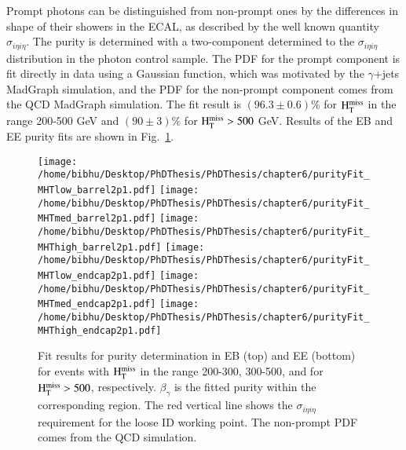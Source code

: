 Prompt photons can be distinguished from non-prompt ones by the differences in shape of their 
showers in the ECAL, as described by the well known quantity $\sigma_{i\eta i\eta}$. 
The purity is determined with a two-component determined to the $\sigma_{i\eta i\eta}$ distribution 
in the photon control sample.  The PDF for the prompt component is fit directly in data
using a Gaussian function, which was motivated by the $\gamma$+jets 
{\sc MadGraph} simulation, and the PDF for the non-prompt component comes from the QCD 
{\sc MadGraph} simulation.    The fit result is $(96.3 \pm 0.6)\%$ for $\rm H_{T}^{miss}$ in the range 200-500 GeV 
and $(90 \pm 3)\%$ for $\rm H_{T}^{miss} > 500$ GeV. Results of the EB and EE purity fits are shown in Fig.~\ref{fig:purity}. 

\begin{figure}[h]
\begin{center}
\texttt{[image: /home/bibhu/Desktop/PhDThesis/PhDThesis/chapter6/purityFit\_MHTlow\_barrel2p1.pdf]} 
\texttt{[image: /home/bibhu/Desktop/PhDThesis/PhDThesis/chapter6/purityFit\_MHTmed\_barrel2p1.pdf]} 
\texttt{[image: /home/bibhu/Desktop/PhDThesis/PhDThesis/chapter6/purityFit\_MHThigh\_barrel2p1.pdf]} 
\texttt{[image: /home/bibhu/Desktop/PhDThesis/PhDThesis/chapter6/purityFit\_MHTlow\_endcap2p1.pdf]} 
\texttt{[image: /home/bibhu/Desktop/PhDThesis/PhDThesis/chapter6/purityFit\_MHTmed\_endcap2p1.pdf]} 
\texttt{[image: /home/bibhu/Desktop/PhDThesis/PhDThesis/chapter6/purityFit\_MHThigh\_endcap2p1.pdf]} 
\caption{Fit results for purity determination in EB (top) and EE (bottom) for events with $\rm H_{T}^{miss}$ in the range 200-300, 300-500, and for $\rm H_{T}^{miss} > 500$, 
respectively.  $\beta_\gamma$ is the fitted purity within the corresponding region.  The red vertical line shows the $\sigma_{i\eta i\eta}$ 
requirement for the loose ID working point.  The non-prompt PDF comes from the QCD simulation.}
\label{fig:purity}
\end{center}
\end{figure}

